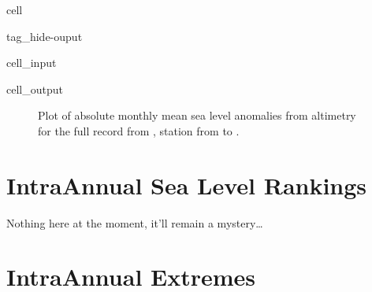 \documentclass[letterpaper,10pt,english]{jupyterBook}
\begin{document}
\begin{sphinxuseclass}{cell}
\begin{sphinxuseclass}{tag_hide-ouput}
\begin{sphinxVerbatimInput}
\begin{sphinxuseclass}{cell_input}
\end{sphinxuseclass}\end{sphinxVerbatimInput}
\begin{sphinxVerbatimOutput}

\begin{sphinxuseclass}{cell_output}
\noindent{}

\end{sphinxuseclass}\end{sphinxVerbatimOutput}

\end{sphinxuseclass}
\end{sphinxuseclass}
\begin{figure}[htbp]
\centering
\capstart

\noindent{}
\caption{Plot of absolute monthly mean sea level anomalies from altimetry for the full record from ,  station from  to .}\label{\detokenize{notebooks/regional_and_local/SL_anomaly_intra-annual:sl-anomaly-timeseries}}\end{figure}

\sphinxstepscope


\section{Intra\sphinxhyphen{}Annual Sea Level Rankings}
\label{\detokenize{notebooks/regional_and_local/SL_Rankings_intra-annual:intra-annual-sea-level-rankings}}\label{\detokenize{notebooks/regional_and_local/SL_Rankings_intra-annual::doc}}
\sphinxAtStartPar
Nothing here at the moment, it’ll remain a mystery…

\sphinxstepscope


\section{Intra\sphinxhyphen{}Annual Extremes}
\label{\detokenize{notebooks/regional_and_local/SL_Extremes_intra-annual:intra-annual-extremes}}\label{\detokenize{notebooks/regional_and_local/SL_Extremes_intra-annual::doc}}
\sphinxstepscope
\end{document}
